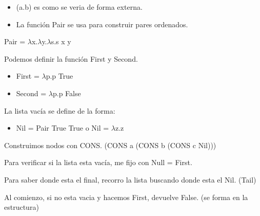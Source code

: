 \begin{itemize}
\item (a.b) es como se veria de forma externa.
\item La función Pair se usa para construir pares ordenados.
\end{itemize}


\begin{center}
Pair = $\lambda$x.$\lambda$y.$\lambda$s.s x y
\end{center}

Podemos definir la función First y Second.

\begin{itemize}
\item First = $\lambda$p.p True 
\item Second = $\lambda$p.p False 
\end{itemize}

La lista vacía se define de la forma:

\begin{itemize}
\item Nil = Pair True True o Nil = $\lambda$z.z
\end{itemize}

Construimos nodos con CONS. 
(CONS a (CONS b (CONS c Nil)))

Para verificar si la lista esta vacía, me fijo con Null = First. 

Para saber donde esta el final, recorro la lista buscando donde esta el Nil. (Tail)

Al comienzo, si no esta vacia y hacemos First, devuelve False. (se forma en la estructura)

